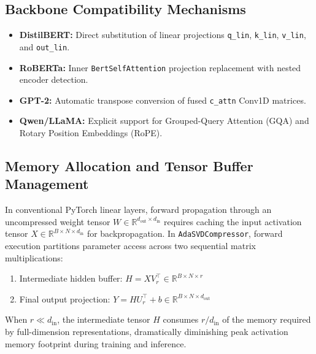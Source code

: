 \documentclass{article}
\begin{document}
\subsection{Backbone Compatibility Mechanisms}
\begin{itemize}
\item \textbf{DistilBERT:} Direct substitution of linear projections \texttt{q\_lin}, \texttt{k\_lin}, \texttt{v\_lin}, and \texttt{out\_lin}.
\item \textbf{RoBERTa:} Inner \texttt{BertSelfAttention} projection replacement with nested encoder detection.
\item \textbf{GPT-2:} Automatic transpose conversion of fused \texttt{c\_attn} Conv1D matrices.
\item \textbf{Qwen/LLaMA:} Explicit support for Grouped-Query Attention (GQA) and Rotary Position Embeddings (RoPE).
\end{itemize}

\subsection{Memory Allocation and Tensor Buffer Management}
In conventional PyTorch linear layers, forward propagation through an uncompressed weight tensor $W \in \mathbb{R}^{d_{\text{out}} \times d_{\text{in}}}$ requires caching the input activation tensor $X \in \mathbb{R}^{B \times N \times d_{\text{in}}}$ for backpropagation. In \texttt{AdaSVDCompressor}, forward execution partitions parameter access across two sequential matrix multiplications:
\begin{enumerate}
\item Intermediate hidden buffer: $H = X V_r^\top \in \mathbb{R}^{B \times N \times r}$
\item Final output projection: $Y = H U_r^\top + b \in \mathbb{R}^{B \times N \times d_{\text{out}}}$
\end{enumerate}
When $r \ll d_{\text{in}}$, the intermediate tensor $H$ consumes $r / d_{\text{in}}$ of the memory required by full-dimension representations, dramatically diminishing peak activation memory footprint during training and inference.
\end{document}
